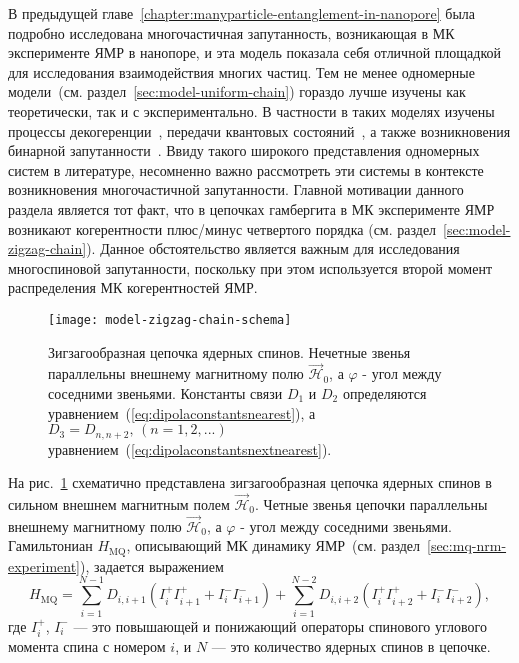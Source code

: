 В предыдущей главе~\ref{chapter:manyparticle-entanglement-in-nanopore}
была подробно исследована многочастичная запутанность,
возникающая в МК эксперименте ЯМР в нанопоре,
и эта модель показала себя отличной площадкой
для исследования взаимодействия многих частиц.
Тем не менее одномерные модели~(см. раздел~\ref{sec:model-uniform-chain})
гораздо лучше изучены как теоретически,
так и с экспериментально.
В частности в таких моделях изучены процессы
декогеренции~\cite{Bochkin2018},
передачи квантовых состояний~\cite{Lazarev2019},
а также возникновения бинарной запутанности~\cite{Feldman2012, Lazarev2019}.
Ввиду такого широкого представления одномерных систем в литературе,
несомненно важно рассмотреть эти системы в контексте возникновения многочастичной запутанности.
Главной мотивации данного раздела является тот факт,
что в цепочках гамбергита в МК эксперименте ЯМР возникают когерентности плюс/минус четвертого порядка (см. раздел~\ref{sec:model-zigzag-chain}).
Данное обстоятельство является важным для исследования многоспиновой запутанности,
поскольку при этом используется второй момент распределения МК когерентностей ЯМР.

\begin{figure}[H]
    \centering
    \texttt{[image: model-zigzag-chain-schema]}
    \caption{
      Зигзагообразная цепочка ядерных спинов.
      Нечетные звенья параллельны внешнему магнитному полю $\vec{\mathcal H}_0$,
      а $\varphi$ - угол между соседними звеньями.
      Константы связи $D_1$ и $D_2$ определяются уравнением~(\ref{eq:dipolaconstantsnearest}), а $D_3=D_{n, n+2},\, (n=1,2,...)$
      уравнением~(\ref{eq:dipolaconstantsnextnearest}).
    }
    \label{fig:model-zigzag-chain-schema}
\end{figure}

На рис.~\ref{fig:model-zigzag-chain-schema} схематично представлена
зигзагообразная цепочка ядерных спинов в сильном внешнем магнитным полем $\vec{\mathcal H}_0$.
Четные звенья цепочки параллельны внешнему магнитному полю $\vec{\mathcal H}_0$,
а $\varphi$ - угол между соседними звеньями.
Гамильтониан $H_\mathrm{MQ}$,
описывающий МК динамику ЯМР~(см. раздел~\ref{sec:mq-nrm-experiment}),
задается выражением~\cite{Doronin2000}
%
\begin{equation}\label{hmqnextnearest}
 H_\mathrm{MQ} = \sum_{i=1}^{N-1} D_{i, i+1}(I_i^{+}I_{i+1}^{+}+ I_i^{-}I_{i+1}^{-} )
   + \sum_{i=1}^{N-2} D_{i, i+2}(I_i^{+}I_{i+2}^{+}+ I_i^{-}I_{i+2}^{-} ) ,
\end{equation}
%
где $I_i^+$, $I_i^-$ --- это повышающей и понижающий операторы спинового углового момента спина с номером $i$,
и $N$ --- это количество ядерных спинов в цепочке.

